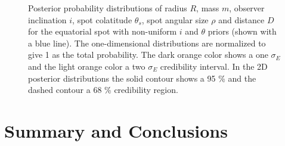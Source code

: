 \documentclass{wihuri}
\begin{document}
\begin{figure}
\centerline{}
\caption{Posterior probability distributions of radius $R$, mass $m$, observer inclination $i$, spot colatitude $\theta_{s}$, spot angular size $\rho$ and distance $D$ for the equatorial spot with non-uniform $i$ and $\theta$ priors (shown with a blue line). The one-dimensional distributions are normalized to give 1 as the total probability. The dark orange color shows a one $\sigma_{E}$ and the light orange color a two $\sigma_{E}$ credibility interval. In the 2D posterior distributions the solid contour shows a 95 \% and the dashed contour a 68 \% credibility region.
\label{fig:eqpostpr}}
\end{figure}



\clearpage


\section{Summary and Conclusions}










\iffalse
\begin{figure}
\begin{center}
\setlength{\unitlength}{1cm}
\begin{picture}(6,6)(-3,-3)
\put(-1.5,0){\vector(1,0){3}}
\put(2.7,-0.1){$\chi$}
\put(0,-1.5){\vector(0,1){3}}
\multiput(-2.5,1)(0.4,0){13}
{\line(1,0){0.2}}
\multiput(-2.5,-1)(0.4,0){13}
{\line(1,0){0.2}}
\put(0.2,1.4)
{$\beta=v/c=\tanh\chi$}
\qbezier(0,0)(0.8853,0.8853)
(2,0.9640)
\qbezier(0,0)(-0.8853,-0.8853)
(-2,-0.9640)
\end{picture}
\caption{Tässä on hieno kuva}
\label{kuva1}
\end{center}
\end{figure}
\fi


\end{document}
